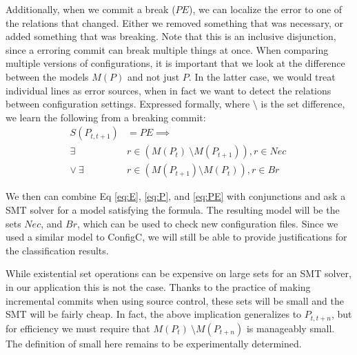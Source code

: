 Additionally, when we commit a break ($PE$), we can localize the error to one of the relations that changed.
Either we removed something that was necessary, or added something that was breaking.
Note that this is an inclusive disjunction, since a erroring commit can break multiple things at once.
When comparing multiple versions of configurations, it is important that we look at the difference between the models $M(P)$ and not just $P$.
In the latter case, we would treat individual lines as error sources, when in fact we want to detect the relations between configuration settings.
Expressed formally, where $\setminus$ is the set difference, we learn the following from a breaking commit:
\begin{align}
  S(P_{t,t+1}) &= PE \implies \nonumber \\
  \exists& r \in (M(P_{t})\ \setminus M(P_{t+1})), r \in Nec\ \nonumber \\
  \lor \ \exists& r \in (M(P_{t+1}) \setminus M(P_{t})), r \in Br \label{eq:PE}
\end{align}

We then can combine Eq \ref{eq:E}, \ref{eq:P}, and \ref{eq:PE} with conjunctions and ask a SMT solver for a model satisfying the formula.
The resulting model will be the sets $Nec$, and $Br$, which can be used to check new configuration files.
Since we used a similar model to ConfigC, we will still be able to provide justifications for the classification results.

While existential set operations can be expensive on large sets for an SMT solver, in our application this is not the case.
Thanks to the practice of making incremental commits when using source control, these sets will be small and the SMT will be fairly cheap.
In fact, the above implication generalizes to $P_{t,t+n}$, but for efficiency we must require that $M(P_{t})\ \setminus M(P_{t+n})$ is manageably small.
The definition of small here remains to be experimentally determined.
